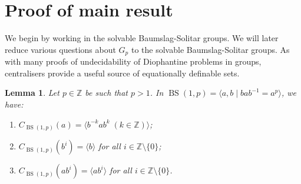 \documentclass[11pt]{amsart}
\newtheorem{lem}[theorem]{Lemma}
\theoremstyle{definition}
\numberwithin{theorem}{section}
\newcommand{\Z}{\mathbb{Z}}
\begin{document}
\section{Proof of main result}

We begin by working in the solvable Baumslag-Solitar groups. We will later
reduce various questions about \(G_p\) to the solvable Baumslag-Solitar groups.
As with many proofs of undecidability of Diophantine problems in groups,
centralisers provide a useful source of equationally definable sets.

\begin{lem}
	\label{BS-cents}
	Let \(p \in \Z\) be such that \(p > 1\). In \(\operatorname{BS}(1, p) =
	\langle a, b \mid bab^{-1} = a^p \rangle\), we have:
	\begin{enumerate}
		\item \(C_{\operatorname{BS}(1, p)}(a) = \langle b^{-k} a b^k \; (k \in \Z) \rangle\);
			\label{item:BS-cent-a}
		\item \(C_{\operatorname{BS}(1, p)}(b^i) = \langle b \rangle\) for all
				\(i \in \Z \setminus \{0\}\);
			\label{item:BS-cent-b}
		\item \(C_{\operatorname{BS}(1, p)}(ab^i) = \langle ab^i \rangle\) for all
				\(i \in \Z \setminus \{0\}\).
			\label{item:BS-cent-abi}
	\end{enumerate}
\end{lem}
\end{document}
